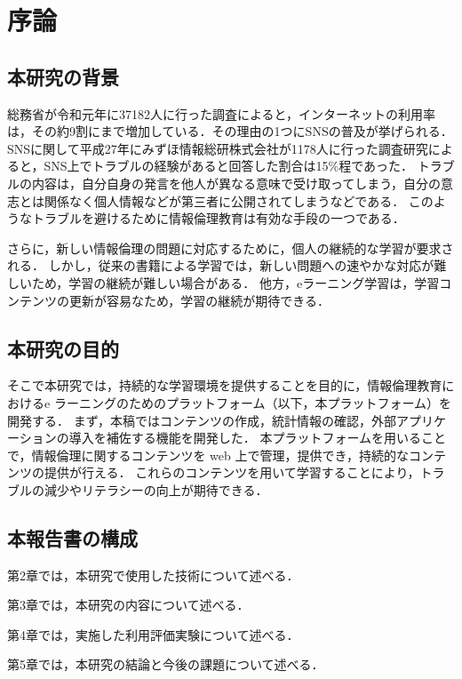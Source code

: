 \section{序論}\label{sec1}
\subsection{本研究の背景}

総務省が令和元年に37182人に行った調査によると，インターネットの利用率は，その約9割にまで増加している\cite{soumu}．その理由の1つにSNSの普及が挙げられる．
SNSに関して平成27年にみずほ情報総研株式会社が1178人に行った調査研究\cite{mizuho}によると，SNS上でトラブルの経験があると回答した割合は15\%程であった．
トラブルの内容は，自分自身の発言を他人が異なる意味で受け取ってしまう，自分の意志とは関係なく個人情報などが第三者に公開されてしまうなどである．
このようなトラブルを避けるために情報倫理教育は有効な手段の一つである\cite{moraru}．

さらに，新しい情報倫理の問題に対応するために，個人の継続的な学習が要求される\cite{fluency}．
しかし，従来の書籍による学習では，新しい問題への速やかな対応が難しいため，学習の継続が難しい場合がある．
他方，eラーニング学習は，学習コンテンツの更新が容易なため，学習の継続が期待できる\cite{chieru}．

\subsection{本研究の目的}

そこで本研究では，持続的な学習環境を提供することを目的に，情報倫理教育におけるe ラーニングのためのプラットフォーム（以下，本プラットフォーム）を開発する．
まず，本稿ではコンテンツの作成，統計情報の確認，外部アプリケーションの導入を補佐する機能を開発した．
本プラットフォームを用いることで，情報倫理に関するコンテンツを web 上で管理，提供でき，持続的なコンテンツの提供が行える．
これらのコンテンツを用いて学習することにより，トラブルの減少やリテラシーの向上が期待できる．

\subsection{本報告書の構成}

第2章では，本研究で使用した技術について述べる．

第3章では，本研究の内容について述べる．

第4章では，実施した利用評価実験について述べる．

第5章では，本研究の結論と今後の課題について述べる．
